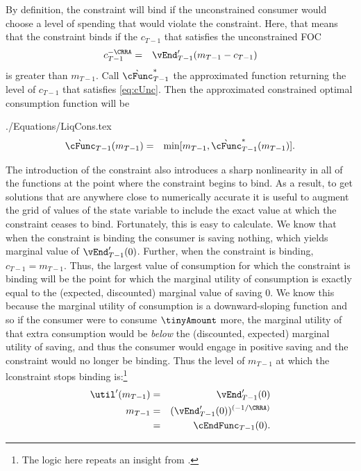 \documentclass[titlepage]{\econtex}
\begin{document}

By definition, the constraint will bind if the unconstrained consumer
would choose a level of spending that would violate the constraint.
Here, that means that the constraint binds if the ${c}_{T-1}$
that satisfies the unconstrained FOC
\begin{eqnarray}
  {c}_{T-1}^{-\CRRA} & = & \vEnd_{T-1}^{\prime}({m}_{T-1}-{c}_{T-1}) \label{eq:cUnc}
\end{eqnarray}
is greater than ${m}_{T-1}$.  Call $\grave{\cFunc}^{\ast}_{T-1}$ the approximated function
returning the level of ${c}_{T-1}$ that satisfies \eqref{eq:cUnc}.
Then the approximated constrained optimal consumption function will be
\begin{verbatimwrite}{./Equations/LiqCons.tex}
  \begin{eqnarray}
    \grave{\cFunc}_{T-1}({m}_{T-1}) & = & \min[{m}_{T-1},\grave{\cFunc}^{\ast}_{T-1}({m}_{T-1})] \label{eq:LiqCons}.
  \end{eqnarray}
\end{verbatimwrite}



The introduction of the constraint also introduces a sharp
nonlinearity in all of the functions at the point where the constraint
begins to bind.  As a result, to get solutions that are anywhere close
to numerically accurate it is useful to augment the grid of values of
the state variable to include the exact value at which the constraint
ceases to bind.  Fortunately, this is easy to calculate.  We know that
when the constraint is binding the consumer is saving nothing, which
yields marginal value of $\vEnd_{T-1}^{\prime}(0)$. Further, when the
constraint is binding, ${c}_{T-1} = {m}_{T-1}$.  Thus, the largest
value of consumption for which the constraint is binding will be the
point for which the marginal utility of consumption is exactly equal
to the (expected, discounted) marginal value of saving 0.  We know
this because the marginal utility of consumption is a downward-sloping
function and so if the consumer were to consume $\tinyAmount$ more,
the marginal utility of that extra consumption would be \textit{below}
the (discounted, expected) marginal utility of saving, and thus the
consumer would engage in positive saving and the constraint would no
longer be binding.  Thus the level of ${m}_{T-1}$ at which the
lconstraint stops binding is:\footnote{The logic here repeats an insight from \cite{deatonLiqConstr}.}
\begin{eqnarray}
  \util^{\prime}({m}_{T-1}) & = & \vEnd_{T-1}^{\prime}(0)  \nonumber \\
  {m}_{T-1} & = & (\vEnd_{T-1}^{\prime}(0))^{(-1/\CRRA)}  \nonumber
  \\       & = & \cEndFunc_{T-1}(0). \label{eq:LCbindsTm1}
\end{eqnarray}
\end{document}
